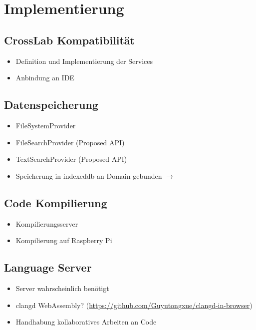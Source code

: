 \chapter{Implementierung} \label{implementierung}

\section{CrossLab Kompatibilität}

\begin{itemize}
    \item Definition und Implementierung der Services
    \item Anbindung an IDE
\end{itemize}

\section{Datenspeicherung}

\begin{itemize}
    \item FileSystemProvider
    \item FileSearchProvider (Proposed API)
    \item TextSearchProvider (Proposed API)
    \item Speicherung in indexeddb an Domain gebunden $\to$
\end{itemize}

\section{Code Kompilierung}

\begin{itemize}
    \item Kompilierungsserver
    \item Kompilierung auf Raspberry Pi
\end{itemize}

\section{Language Server}

\begin{itemize}
    \item Server wahrscheinlich benötigt
    \item clangd WebAssembly? (\href{https://github.com/Guyutongxue/clangd-in-browser}{https://github.com/Guyutongxue/clangd-in-browser})
    \item Handhabung kollaboratives Arbeiten an Code
\end{itemize}

